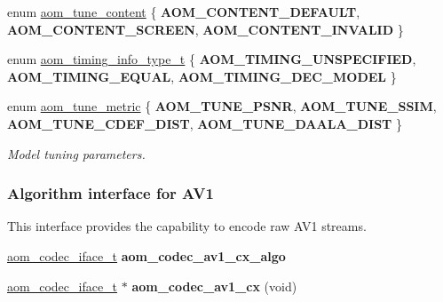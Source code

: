\begin{DoxyCompactItemize}
\item 
enum \hyperlink{group__aom__encoder_ga801f5eb2cb93da19a2f347ae7a44166a}{aom\+\_\+tune\+\_\+content} \{ {\bfseries A\+O\+M\+\_\+\+C\+O\+N\+T\+E\+N\+T\+\_\+\+D\+E\+F\+A\+U\+LT}, 
{\bfseries A\+O\+M\+\_\+\+C\+O\+N\+T\+E\+N\+T\+\_\+\+S\+C\+R\+E\+EN}, 
{\bfseries A\+O\+M\+\_\+\+C\+O\+N\+T\+E\+N\+T\+\_\+\+I\+N\+V\+A\+L\+ID}
 \}
\item 
enum \hyperlink{group__aom__encoder_gad69c1d6aa10530991eeb1a3f0a818cba}{aom\+\_\+timing\+\_\+info\+\_\+type\+\_\+t} \{ {\bfseries A\+O\+M\+\_\+\+T\+I\+M\+I\+N\+G\+\_\+\+U\+N\+S\+P\+E\+C\+I\+F\+I\+ED}, 
{\bfseries A\+O\+M\+\_\+\+T\+I\+M\+I\+N\+G\+\_\+\+E\+Q\+U\+AL}, 
{\bfseries A\+O\+M\+\_\+\+T\+I\+M\+I\+N\+G\+\_\+\+D\+E\+C\+\_\+\+M\+O\+D\+EL}
 \}
\item 
enum \hyperlink{group__aom__encoder_gaafd352cc596fab5388558950f8bbe739}{aom\+\_\+tune\+\_\+metric} \{ {\bfseries A\+O\+M\+\_\+\+T\+U\+N\+E\+\_\+\+P\+S\+NR}, 
{\bfseries A\+O\+M\+\_\+\+T\+U\+N\+E\+\_\+\+S\+S\+IM}, 
{\bfseries A\+O\+M\+\_\+\+T\+U\+N\+E\+\_\+\+C\+D\+E\+F\+\_\+\+D\+I\+ST}, 
{\bfseries A\+O\+M\+\_\+\+T\+U\+N\+E\+\_\+\+D\+A\+A\+L\+A\+\_\+\+D\+I\+ST}
 \}\begin{DoxyCompactList}\small\item\em Model tuning parameters. \end{DoxyCompactList}
\end{DoxyCompactItemize}
\subsubsection*{Algorithm interface for A\+V1}
\label{_amgrp8c574bd9a585a04008b0d15257056884}%
This interface provides the capability to encode raw A\+V1 streams. \begin{DoxyCompactItemize}
\item 
\mbox{\label{group__aom__encoder_ga18350b1c0642494e2b1a970104b2e8b9}} 
\hyperlink{group__codec_ga4ef55b44c762836d1550e11921bed403}{aom\+\_\+codec\+\_\+iface\+\_\+t} {\bfseries aom\+\_\+codec\+\_\+av1\+\_\+cx\+\_\+algo}
\item 
\mbox{\label{group__aom__encoder_ga5b742eec203f55a95cc404f41c0166d8}} 
\hyperlink{group__codec_ga4ef55b44c762836d1550e11921bed403}{aom\+\_\+codec\+\_\+iface\+\_\+t} $\ast$ {\bfseries aom\+\_\+codec\+\_\+av1\+\_\+cx} (void)
\end{DoxyCompactItemize}


